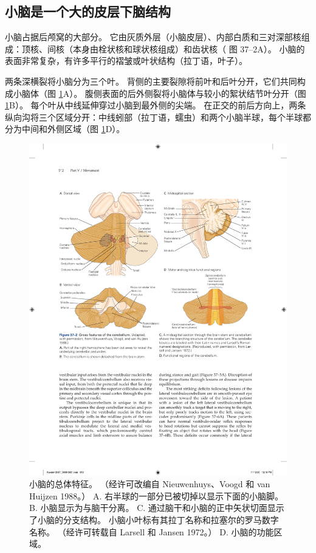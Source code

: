 \subsection{小脑是一个大的皮层下脑结构}
小脑占据后颅窝的大部分。 它由灰质外层（小脑皮层）、内部白质和三对深部核组成：顶核、间核（本身由栓状核和球状核组成）和齿状核（ 图 37–2A）。 小脑的表面非常复杂，有许多平行的褶皱或叶状结构（拉丁语，叶子）。

两条深横裂将小脑分为三个叶。 
背侧的主要裂隙将前叶和后叶分开，它们共同构成小脑体（图 \ref{fig:37_2}A）。 
腹侧表面的后外侧裂将小脑体与较小的絮状结节叶分开（图 \ref{fig:37_2}B）。
每个叶从中线延伸穿过小脑到最外侧的尖端。 在正交的前后方向上，两条纵向沟将三个区域分开：中线蚓部（拉丁语，蠕虫）和两个小脑半球，每个半球都分为中间和外侧区域（图 \ref{fig:37_2}D）。

\begin{figure}[htbp]
	\centering
	\includegraphics[width=0.9\linewidth]{chap37/fig_37_2}
	\caption{小脑的总体特征。 （经许可改编自 Nieuwenhuys、Voogd 和 van Huijzen 1988。） A. 右半球的一部分已被切掉以显示下面的小脑脚。 B. 小脑显示为与脑干分离。 C. 通过脑干和小脑的正中矢状切面显示了小脑的分支结构。 小脑小叶标有其拉丁名称和拉塞尔的罗马数字名称。 （经许可转载自 Larsell 和 Jansen 1972。） D. 小脑的功能区域。}
	\label{fig:37_2}
\end{figure}

